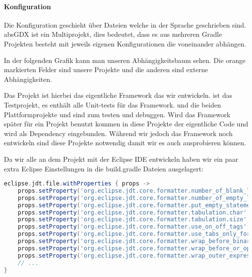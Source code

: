 \paragraph{Konfiguration}

Die Konfiguration geschieht über  Dateien welche in der Sprache  geschrieben sind.
absGDX ist ein Multiprojekt, dies bedeutet, dass es  aus mehreren Gradle Projekten besteht mit jeweils eigenen Konfigurationen die voneinander abhängen.

In der folgenden Grafik kann man unseren Abhängigkeitsbaum sehen. Die orange markierten Felder sind unsere Projekte und die anderen sind externe Abhängigkeiten.


Das Projekt  ist hierbei das eigentliche Framework das wir entwickeln.  ist das Testprojekt, es enthält alle Unit-tests für das Framework.
 und die beiden Plattformprojekte  und  sind zum testen und debuggen. Wird das Framework später für ein Projekt benutzt kommen in diese Projekte der eigentliche Code und  wird als Dependency eingebunden. Während wir jedoch das Framework noch entwickeln sind diese Projekte notwendig damit wir es auch ausprobieren können.

Da wir alle an dem Projekt mit der Eclipse IDE entwickeln haben wir ein paar extra Eclipse Einstellungen in die build.gradle Dateien ausgelagert:

\doinline %
\begin{lstlisting}[caption=Eclipse Optionen in gradle setzen, title=\hspace{0 pt}, language=groovy]
eclipse.jdt.file.withProperties { props ->
    props.setProperty('org.eclipse.jdt.core.formatter.number_of_blank_lines_at_beginning_of_method_body', '0')
    props.setProperty('org.eclipse.jdt.core.formatter.number_of_empty_lines_to_preserve', '1')
    props.setProperty('org.eclipse.jdt.core.formatter.put_empty_statement_on_new_line', 'true')
    props.setProperty('org.eclipse.jdt.core.formatter.tabulation.char', 'tab')
    props.setProperty('org.eclipse.jdt.core.formatter.tabulation.size', '4')
    props.setProperty('org.eclipse.jdt.core.formatter.use_on_off_tags', 'false')
    props.setProperty('org.eclipse.jdt.core.formatter.use_tabs_only_for_leading_indentations', 'false')
    props.setProperty('org.eclipse.jdt.core.formatter.wrap_before_binary_operator', 'true')
    props.setProperty('org.eclipse.jdt.core.formatter.wrap_before_or_operator_multicatch', 'true')
    props.setProperty('org.eclipse.jdt.core.formatter.wrap_outer_expressions_when_nested', 'true')
    // ...
}
\end{lstlisting}

